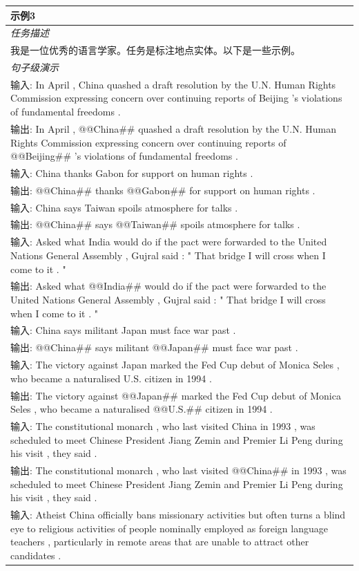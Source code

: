 \documentclass[supercite]{Experimental_Report}
\theoremstyle{definition}
\begin{document}
\begin{table}[th!]
{\begin{tabular}{l}
\textbf{示例3} \\\midrule
       	\textit{任务描述} \\
我是一位优秀的语言学家。任务是标注地点实体。以下是一些示例。 \\\midrule
\textit{句子级演示} \\
输入: In April , China quashed a draft resolution by the U.N. Human Rights Commission expressing concern over continuing reports of Beijing 's violations of fundamental freedoms . \\
输出: In April , @@China\#\# quashed a draft resolution by the U.N. Human Rights Commission expressing concern over continuing reports of @@Beijing\#\# 's violations of fundamental freedoms . \\
输入: China thanks Gabon for support on human rights . \\
输出: @@China\#\# thanks @@Gabon\#\# for support on human rights . \\
输入: China says Taiwan spoils atmosphere for talks . \\
输出: @@China\#\# says @@Taiwan\#\# spoils atmosphere for talks . \\
输入: Asked what India would do if the pact were forwarded to the United Nations General Assembly , Gujral said : " That bridge I will cross when I come to it . " \\
输出: Asked what @@India\#\# would do if the pact were forwarded to the United Nations General Assembly , Gujral said : " That bridge I will cross when I come to it . " \\
输入: China says militant Japan must face war past . \\
输出: @@China\#\# says militant @@Japan\#\# must face war past . \\
输入: The victory against Japan marked the Fed Cup debut of Monica Seles , who became a naturalised U.S. citizen in 1994 . \\
输出: The victory against @@Japan\#\# marked the Fed Cup debut of Monica Seles , who became a naturalised @@U.S.\#\# citizen in 1994 . \\
输入: The constitutional monarch , who last visited China in 1993 , was scheduled to meet Chinese President Jiang Zemin and Premier Li Peng during his visit , they said . \\
输出: The constitutional monarch , who last visited @@China\#\# in 1993 , was scheduled to meet Chinese President Jiang Zemin and Premier Li Peng during his visit , they said . \\
输入: Atheist China officially bans missionary activities but often turns a blind eye to religious activities of people nominally employed as foreign language teachers , particularly in remote areas that are unable to attract other candidates . \\

\end{tabular}}
\end{table}
\end{document}
